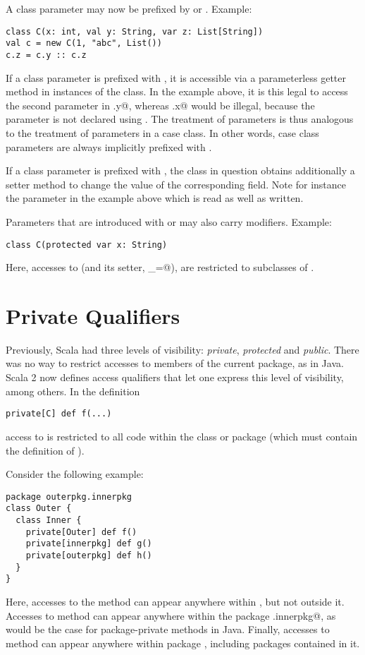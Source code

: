 \documentclass[a4paper,11pt,twoside]{article}
\begin{document}
A class parameter may now be prefixed by \lstinline@val@ or
\lstinline@var@. Example:
\begin{lstlisting}
class C(x: int, val y: String, var z: List[String])
val c = new C(1, "abc", List())
c.z = c.y :: c.z
\end{lstlisting}
If a class parameter is prefixed with \lstinline@val@, it is
accessible via a parameterless getter method in instances of the
class.  In the example above, it is this legal to access the second
parameter in \lstinline@c.y@, whereas \lstinline@c.x@ would be
illegal, because the \lstinline@x@ parameter is not declared using
\lstinline@val@. The treatment of \lstinline@val@ parameters is thus
analogous to the treatment of parameters in a case class. In other words,
case class parameters are always implicitly prefixed with \lstinline@val@.

If a class parameter is prefixed with \lstinline@var@, the class in
question obtains additionally a setter method to change the value of
the corresponding field. Note for instance the \lstinline@z@ parameter
in the example above which is read as well as written.

Parameters that are introduced with \lstinline@val@ or \lstinline@var@
may also carry modifiers. Example:
\begin{lstlisting}
class C(protected var x: String)
\end{lstlisting}
Here, accesses to \lstinline@x@ (and its setter, \lstinline@x_=@), are
restricted to subclasses of \lstinline@C@.

\section{Private Qualifiers}\label{privatequals}

Previously, Scala had three levels of visibility: {\em private},
{\em protected} and {\em public}. There was no way to
restrict accesses to members of the current package, as in Java. Scala
2 now defines access qualifiers that let one express this level of
visibility, among others. In the definition
\begin{lstlisting}
private[C] def f(...)
\end{lstlisting}
access to \lstinline@f@ is restricted to all code within the class or
package \lstinline@C@ (which must contain the definition of \lstinline@f@).

Consider the following example:
\begin{lstlisting}
package outerpkg.innerpkg
class Outer {
  class Inner {
    private[Outer] def f()
    private[innerpkg] def g()
    private[outerpkg] def h()
  }
}
\end{lstlisting}
Here, accesses to the method \lstinline@f@ can appear anywhere within
\lstinline@OuterClass@, but not outside it. Accesses to method
\lstinline@g@ can appear anywhere within the package
\lstinline@outerpkg.innerpkg@, as would be the case for
package-private methods in Java. Finally, accesses to method
\lstinline@h@ can appear anywhere within package \lstinline@outerpkg@,
including packages contained in it. 
\end{document}
